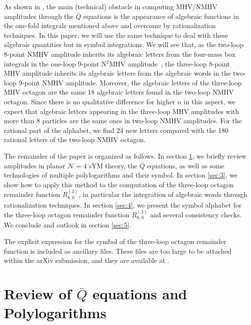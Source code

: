 \documentclass[a4paper,12pt]{article}
\begin{document}
As shown in \cite{Zhang:2019vnm}, the main (technical) obstacle in computing MHV/NMHV amplitudes through the $\bar{Q}$ equations is the appearance of algebraic functions in the one-fold integrals mentioned above and overcome by rationalization techniques.
In this paper, we will use the same technique to deal with these algebraic quantities but in symbol integrations. We will see that, as the two-loop 8-point NMHV amplitude inherits its algebraic letters from the four-mass box integrals in the one-loop 9-point N$^{2}$MHV amplitude~\cite{Zhang:2019vnm}, the three-loop 8-point MHV amplitude inherits its algebraic letters from the algebraic words in the two-loop 9-point NMHV amplitude. Moreover, the algebraic letters of the three-loop MHV octagon are the same 18 algebraic letters found in the two-loop NMHV octagon. Since there is no qualitative difference for higher $n$ in this aspect, we expect that algebraic letters appearing in the three-loop MHV amplitudes with more than 8 particles are the same ones in two-loop NMHV amplitudes. For the rational part of the alphabet, we find 24 new letters compared with the 180 rational letters of the two-loop NMHV octagon.

The remainder of the paper is organized as follows. In section \ref{sec:2}, we briefly review amplitudes in planar $\mathcal{N}=4$ sYM theory, the $\bar{Q}$ equations, as well as some technologies of multiple polylogarithms and their symbol. In section \ref{sec:3}, we show how to apply this method to the computation of the three-loop octagon remainder function $R_{8,0}^{(3)}$, in particular the integration of algebraic words through rationalization techniques. In section \ref{sec:4}, we present the symbol alphabet for the three-loop octagon remainder function $R_{8,0}^{(3)}$ and several consistency checks. We conclude and outlook in section \ref{sec:5}.

The explicit expression for the symbol of the three-loop octagon remainder function is included as ancillary files. 
These files are too large to be attached within the arXiv submission, and they are available at \cite{3loopmhvoctagondata}.

\section{Review of $\bar{Q}$ equations and Polylogarithms}\label{sec:2}
\end{document}
